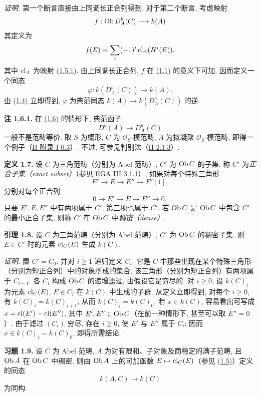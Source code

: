 \emph{证明.} 第一个断言直接由上同调长正合列得到. 对于第二个断言, 考虑映射
\[
 f:\operatorname{Ob} D_A^b(C)\longrightarrow k(A)
\]
其定义为
\[
 f(E)=\sum_i(-1)^i\operatorname{cl}_A(H^i(E)).
\]
其中 \(\operatorname{cl}_A\) 为映射 \hyperlink{sga6.e04.eq.1-5-1}{(1.5.1)}. 由上同调长正合列, \(f\) 在 \hyperlink{sga6.e04.para.1-1}{(1.1)} 的意义下可加, 因而定义一个同态
\[
 \varphi:k(D_A^b(C))\longrightarrow k(A).
\]
由 \hyperlink{sga6.e04.lem.1-4}{(1.4)} 立即得到, \(\varphi\) 为典范同态 \(k(A)\to k(D_A^b(C))\) 的逆.

\textbf{注 1.6.1.} 在 \hyperlink{sga6.e04.lem.1-6}{(1.6)} 的情形下, 典范函子
\[
 D^b(A)\longrightarrow D_A^b(C)
\]
一般不是范畴等价. 取 \(S\) 为概形, \(C\) 为 \(\mathcal O_S\)-模范畴, \(A\) 为拟凝聚 \(\mathcal O_S\)-模范畴, 即得一个例子（\hyperlink{sga6.e02.para.0-3}{II 附录 I 0.3}）. 不过, 可参见判别法（\hyperlink{sga6.e02.lem.2-1-3}{II 2.1.3}）.

\textbf{定义 1.7.} 设 \(C\) 为三角范畴（分别为 Abel 范畴）, \(C'\) 为 \(\operatorname{Ob} C\) 的子集. 称 \(C'\) 为\emph{正合子集（exact subset）}（参见 EGA III 3.1.1）, 如果对每个特殊三角形
\[
 E'\longrightarrow E\longrightarrow E''\longrightarrow E'[1],
\]
分别对每个正合列
\[
 0\longrightarrow E'\longrightarrow E\longrightarrow E''\longrightarrow0,
\]
只要 \(E',E,E''\) 中有两项属于 \(C'\), 第三项也属于 \(C'\). 若 \(\operatorname{Ob} C\) 是 \(\operatorname{Ob} C\) 中包含 \(C'\) 的最小正合子集, 则称 \(C'\) 在 \(\operatorname{Ob} C\) 中\emph{稠密（dense）}.

\textbf{引理 1.8.} 设 \(C\) 为三角范畴（分别为 Abel 范畴）, \(C'\) 为 \(\operatorname{Ob} C\) 的稠密子集. 则 \(E\in C'\) 时的元素 \(\operatorname{cl}_C(E)\) 生成 \(k(C)\).

\emph{证明.} 置 \(C'=C_0\), 并对 \(i\geq1\) 递归定义 \(C_i\): 它是 \(C\) 中那些出现在某个特殊三角形（分别为短正合列）中的对象所成的集合, 该三角形（分别为短正合列）有两项属于 \(C_{i-1}\). 各 \(C_i\) 构成 \(\operatorname{Ob} C\) 的递增滤过, 由假设它是穷尽的. 对 \(i\geq0\), 设 \(k(C)_i\) 为元素 \(\operatorname{cl}_C(E)\), \(E\in C_i\) 在 \(k(C)\) 中生成的子群. 从定义立即得到, 对每个 \(i\geq0\), 有 \(k(C)_i=k(C)_{i+1}\), 从而 \(k(C)_i=k(C)_0\). 若 \(x\in k(C)\), 容易看出可写成 \(x=\operatorname{cl}(E')-\operatorname{cl}(E'')\), 其中 \(E',E''\in\operatorname{Ob} C\)（在前一种情形下, 甚至可以取 \(E''=0\)）. 由于滤过 \((C_i)\) 穷尽, 存在 \(i\geq0\), 使 \(E'\) 与 \(E''\) 属于 \(C_i\); 因而 \(x\in k(C)_i=k(C)_0\), 即得所需结论.

\textbf{习题 1.9.} 设 \(C\) 为 Abel 范畴, \(A\) 为对有限和、子对象及商稳定的满子范畴, 且 \(\operatorname{Ob} A\) 在 \(\operatorname{Ob} C\) 中稠密. 则由 \(\operatorname{Ob} A\) 上的可加函数 \(E\mapsto\operatorname{cl}_C(E)\)（参见 \hyperlink{sga6.e04.para.1-5}{(1.5)}）定义的同态
\[
 k(A,C)\longrightarrow k(C)
\]
为同构.

